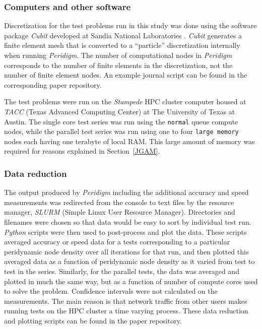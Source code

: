 \documentclass[preprint,12pt]{elsarticle}
\begin{document}
\subsubsection{Computers and other software} 
%
Discretization for the test problems run in this study was done using the software package \emph{Cubit} developed at Sandia National Laboratories \cite{ref-Cubit}. \emph{Cubit} generates a finite element mesh that is converted to a ``particle'' discretization internally when running \emph{Peridigm}. The number of computational nodes in \emph{Peridigm} corresponds to the number of finite elements in the discretization, not the number of finite element nodes.  An example journal script can be found in the corresponding paper repository. 

The test problems were run on the \emph{Stampede} HPC cluster computer housed at \emph{TACC} (Texas Advanced Computing Center) at The University of Texas at Austin. The single core test series was run using the {\tt normal} queue compute nodes, while the parallel test series was run using one to four {\tt large memory} nodes each having one terabyte of local RAM. This large amount of memory was required for reasons explained in Section~\ref{JGAM}.

\subsubsection{Data reduction} 
%
The output produced by \emph{Peridigm} including the additional accuracy and speed measurements was redirected from the console to text files by the resource manager, \emph{SLURM} (Simple Linux User Resource Manager).  Directories and filenames were chosen so that data would be easy to sort by individual test run.  \emph{Python} scripts were then used to post-process and plot the data. These scripts averaged accuracy or speed data for a tests corresponding to a particular peridynamic node density over all iterations for that run, and then plotted this averaged data  as a function of peridynamic node density as it varied from test to test in the series.  Similarly, for the parallel tests, the data was averaged and plotted in much the same way, but as a function of number of compute cores used to solve the problem. Confidence intervals were not calculated on the measurements. The main reason is that network traffic from other users makes running tests on the HPC cluster a time varying process. These data reduction and plotting scripts can be found in the paper repository.
\end{document}

